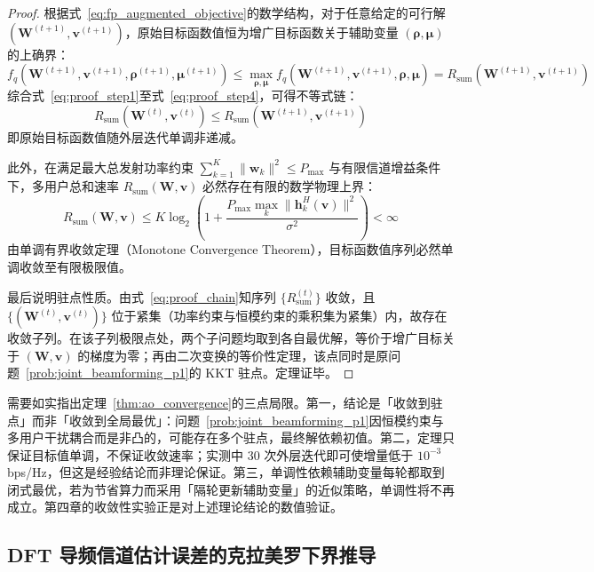 \begin{proof}
  根据式~\eqref{eq:fp_augmented_objective}的数学结构，对于任意给定的可行解 $(\bm{W}^{(t+1)}, \bm{v}^{(t+1)})$，原始目标函数值恒为增广目标函数关于辅助变量 $(\bm{\rho}, \bm{\mu})$ 的上确界：
  \begin{equation}
    f_q\left( \bm{W}^{(t+1)}, \bm{v}^{(t+1)}, \bm{\rho}^{(t+1)}, \bm{\mu}^{(t+1)} \right) \le \max_{\bm{\rho}, \bm{\mu}} f_q\left( \bm{W}^{(t+1)}, \bm{v}^{(t+1)}, \bm{\rho}, \bm{\mu} \right) = R_{\mathrm{sum}}(\bm{W}^{(t+1)}, \bm{v}^{(t+1)})
    \label{eq:proof_step4}
  \end{equation}
  综合式~\eqref{eq:proof_step1}至式~\eqref{eq:proof_step4}，可得不等式链：
  \begin{equation}
    R_{\mathrm{sum}}(\bm{W}^{(t)}, \bm{v}^{(t)}) \le R_{\mathrm{sum}}(\bm{W}^{(t+1)}, \bm{v}^{(t+1)})
    \label{eq:proof_chain}
  \end{equation}
  即原始目标函数值随外层迭代单调非递减。

  此外，在满足最大总发射功率约束 $\sum_{k=1}^K \|\bm{w}_k\|^2 \le P_{\max}$ 与有限信道增益条件下，多用户总和速率 $R_{\mathrm{sum}}(\bm{W}, \bm{v})$ 必然存在有限的数学物理上界：
  \begin{equation}
    R_{\mathrm{sum}}(\bm{W}, \bm{v}) \le K \log_2\left( 1 + \frac{P_{\max} \max_k \|\bm{h}_k^H(\bm{v})\|^2}{\sigma^2} \right) < \infty
    \label{eq:sum_rate_upper_bound}
  \end{equation}
  由单调有界收敛定理（Monotone Convergence Theorem），目标函数值序列必然单调收敛至有限极限值。

  最后说明驻点性质。由式~\eqref{eq:proof_chain}知序列 $\{R_{\mathrm{sum}}^{(t)}\}$ 收敛，且 $\{(\bm{W}^{(t)},\bm{v}^{(t)})\}$ 位于紧集（功率约束与恒模约束的乘积集为紧集）内，故存在收敛子列。在该子列极限点处，两个子问题均取到各自最优解，等价于增广目标关于 $(\bm{W},\bm{v})$ 的梯度为零；再由二次变换的等价性定理，该点同时是原问题~\eqref{prob:joint_beamforming_p1}的 KKT 驻点。定理证毕。
\end{proof}

需要如实指出定理~\ref{thm:ao_convergence}的三点局限。第一，结论是「收敛到驻点」而非「收敛到全局最优」：问题~\eqref{prob:joint_beamforming_p1}因恒模约束与多用户干扰耦合而是非凸的，可能存在多个驻点，最终解依赖初值。第二，定理只保证目标值单调，不保证收敛速率；实测中 30 次外层迭代即可使增量低于 $10^{-3}$ bps/Hz，但这是经验结论而非理论保证。第三，单调性依赖辅助变量每轮都取到闭式最优，若为节省算力而采用「隔轮更新辅助变量」的近似策略，单调性将不再成立。第四章的收敛性实验正是对上述理论结论的数值验证。

\subsection{DFT 导频信道估计误差的克拉美罗下界推导}
\label{sec:crlb_proof}

